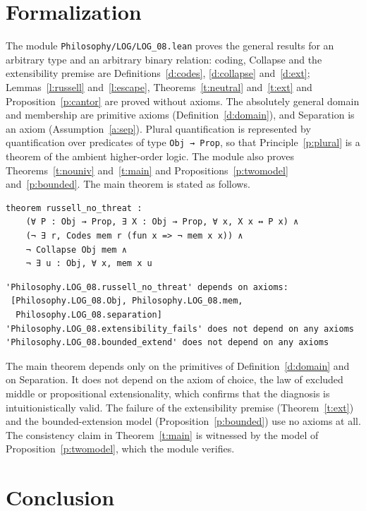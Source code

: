 \documentclass{situationist-preprint}
\begin{document}
\section{Formalization}

The module \nolinkurl{Philosophy/LOG/LOG_08.lean} proves the general results for an arbitrary type and an arbitrary binary relation: coding, Collapse and the extensibility premise are Definitions~\ref{d:codes}, \ref{d:collapse} and~\ref{d:ext}; Lemmas~\ref{l:russell} and~\ref{l:escape}, Theorems~\ref{t:neutral} and~\ref{t:ext} and Proposition~\ref{p:cantor} are proved without axioms. The absolutely general domain and membership are primitive axioms (Definition~\ref{d:domain}), and Separation is an axiom (Assumption~\ref{a:sep}). Plural quantification is represented by quantification over predicates of type \texttt{Obj → Prop}, so that Principle~\ref{p:plural} is a theorem of the ambient higher-order logic. The module also proves Theorems~\ref{t:nouniv} and~\ref{t:main} and Propositions~\ref{p:twomodel} and~\ref{p:bounded}. The main theorem is stated as follows.

\begin{lstlisting}
theorem russell_no_threat :
    (∀ P : Obj → Prop, ∃ X : Obj → Prop, ∀ x, X x ↔ P x) ∧
    (¬ ∃ r, Codes mem r (fun x => ¬ mem x x)) ∧
    ¬ Collapse Obj mem ∧
    ¬ ∃ u : Obj, ∀ x, mem x u
\end{lstlisting}

\begin{lstlisting}
'Philosophy.LOG_08.russell_no_threat' depends on axioms:
 [Philosophy.LOG_08.Obj, Philosophy.LOG_08.mem,
  Philosophy.LOG_08.separation]
'Philosophy.LOG_08.extensibility_fails' does not depend on any axioms
'Philosophy.LOG_08.bounded_extend' does not depend on any axioms
\end{lstlisting}

The main theorem depends only on the primitives of Definition~\ref{d:domain} and on Separation. It does not depend on the axiom of choice, the law of excluded middle or propositional extensionality, which confirms that the diagnosis is intuitionistically valid. The failure of the extensibility premise (Theorem~\ref{t:ext}) and the bounded-extension model (Proposition~\ref{p:bounded}) use no axioms at all. The consistency claim in Theorem~\ref{t:main} is witnessed by the model of Proposition~\ref{p:twomodel}, which the module verifies.

\section{Conclusion}
\end{document}
